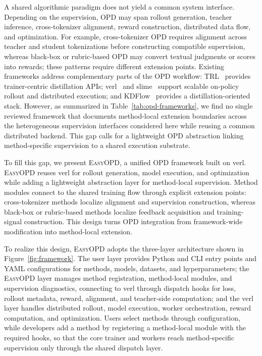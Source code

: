 A shared algorithmic paradigm does not yield a common system interface. Depending on the supervision, OPD may span rollout generation, teacher inference, cross-tokenizer alignment, reward construction, distributed data flow, and optimization. For example, cross-tokenizer OPD requires alignment across teacher and student tokenizations before constructing compatible supervision, whereas black-box or rubric-based OPD may convert textual judgments or scores into rewards; these patterns require different extension points. Existing frameworks address complementary parts of the OPD workflow: TRL~\citep{vonwerra2020trl} provides trainer-centric distillation APIs; verl~\citep{sheng2024hybridflow_verl} and slime~\citep{slime_github} support scalable on-policy rollout and distributed execution; and KDFlow~\citep{zhang2026kdflow} provides a distillation-oriented stack. However, as summarized in Table~\ref{tab:opd-frameworks}, we find no single reviewed framework that documents method-local extension boundaries across the heterogeneous supervision interfaces considered here while reusing a common distributed backend. This gap calls for a lightweight OPD abstraction linking method-specific supervision to a shared execution substrate.


To fill this gap, we present \textsc{EasyOPD}, a unified OPD framework built on verl.
\textsc{EasyOPD} reuses verl for rollout generation, model execution, and optimization while adding a lightweight abstraction layer for method-local supervision.
Method modules connect to the shared training flow through explicit extension points: cross-tokenizer methods localize alignment and supervision construction, whereas black-box or rubric-based methods localize feedback acquisition and training-signal construction.
This design turns OPD integration from framework-wide modification into method-local extension.


To realize this design, \textsc{EasyOPD} adopts the three-layer architecture shown in Figure~\ref{fig:framework}. The user layer provides Python and CLI entry points and YAML configurations for methods, models, datasets, and hyperparameters; the \textsc{EasyOPD} layer manages method registration, method-local modules, and supervision diagnostics, connecting to verl through dispatch hooks for loss, rollout metadata, reward, alignment, and teacher-side computation; and the verl layer handles distributed rollout, model execution, worker orchestration, reward computation, and optimization. Users select methods through configuration, while developers add a method by registering a method-local module with the required hooks, so that the core trainer and workers reach method-specific supervision only through the shared dispatch layer.

